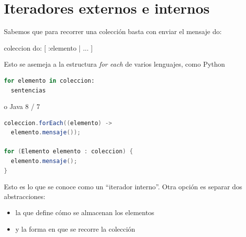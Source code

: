 \documentclass[a4paper,12pt]{book}
\begin{document}
\section{Iteradores externos e internos}

Sabemos que para recorrer una colección basta con enviar el mensaje do: 

\begin{code}
coleccion do: [ :elemento | ... ]
\end{code}

Esto se asemeja a la estructura \textit{for each} de varios lenguajes, como Python

\begin{lstlisting}[language=Python]  
for elemento in coleccion:
  sentencias
\end{lstlisting}

o Java 8 / 7
\begin{lstlisting}[language=Java]  
coleccion.forEach((elemento) ->
  elemento.mensaje());
  
for (Elemento elemento : coleccion) {
  elemento.mensaje();
}
\end{lstlisting}

Esto es lo que se conoce como un ``iterador interno''. Otra opción es separar dos abstracciones:

\begin{itemize}
 \item la que define cómo se almacenan los elementos
 \item y la forma en que se recorre la colección
\end{itemize}
\end{document}
